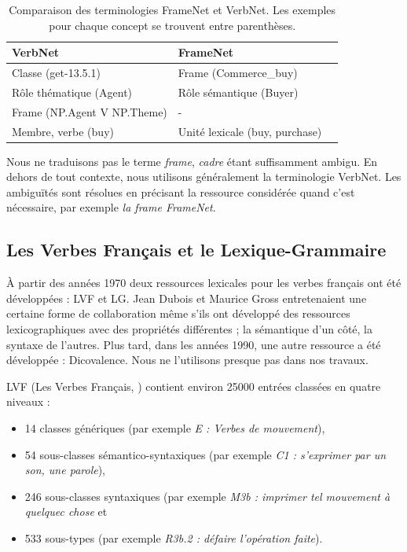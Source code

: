 \begin{table}[ht]
    \centering
    \begin{tabular}{lll}
        \toprule
        VerbNet & FrameNet \\
        \midrule
        Classe (get-13.5.1) & Frame (Commerce\_buy) \\
        Rôle thématique (Agent) & Rôle sémantique (Buyer) \\
        Frame (NP.Agent V NP.Theme) & - \\
        Membre, verbe (buy) & Unité lexicale (buy, purchase) \\
        \bottomrule
    \end{tabular}
    \caption{\label{fnvsvn}Comparaison des terminologies FrameNet et VerbNet.
    Les exemples pour chaque concept se trouvent entre parenthèses.}
\end{table}

Nous ne traduisons pas le terme \textit{frame}, \textit{cadre} étant
suffisamment ambigu. En dehors de tout contexte, nous utilisons généralement la
terminologie VerbNet. Les ambiguïtés sont résolues en précisant la ressource
considérée quand c'est nécessaire, par exemple \textit{la frame FrameNet}.

\subsection{Les Verbes Français et le Lexique-Grammaire}
\label{sec:lvflg}

À partir des années 1970 deux ressources lexicales pour les verbes français ont
été développées : LVF \citep{dubois1970elements,dubois1971introduction} et LG.
Jean Dubois et Maurice Gross entretenaient une certaine forme de collaboration
même s'ils ont développé des ressources lexicographiques avec des propriétés
différentes ; la sémantique d'un côté, la syntaxe de l'autres. Plus tard, dans
les années 1990, une autre ressource a été développée : Dicovalence. Nous ne
l'utilisons presque pas dans nos travaux.

LVF (Les Verbes Français, \cite{dubois1997verbes}) contient environ 25000
entrées classées en quatre niveaux :

\begin{itemize}
    \item 14 classes génériques (par exemple \textit{E : Verbes de mouvement}),
    \item 54 sous-classes sémantico-syntaxiques (par exemple \textit{C1 :
        s'exprimer par un son, une parole}),
    \item 246 sous-classes syntaxiques (par exemple \textit{M3b : imprimer tel
        mouvement à quelquec chose} et
    \item 533 sous-types (par exemple \textit{R3b.2 : défaire l'opération
        faite}).
\end{itemize}

